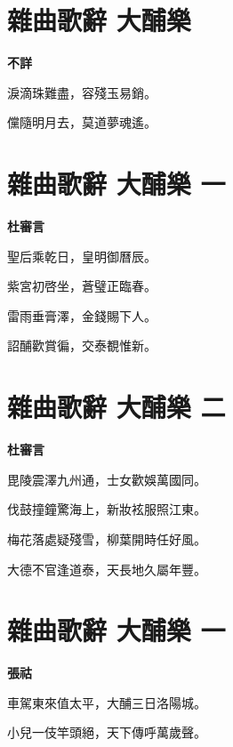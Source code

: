 \documentclass[12pt,a4paper]{ctexbook}
\begin{document}
\section{雜曲歌辭 大酺樂}
\textbf{不詳}\par\vspace{0.5em}
淚滴珠難盡，容殘玉易銷。\par
儻隨明月去，莫道夢魂遙。\par

\section{雜曲歌辭 大酺樂 一}
\textbf{杜審言}\par\vspace{0.5em}
聖后乘乾日，皇明御曆辰。\par
紫宮初啓坐，蒼璧正臨春。\par
雷雨垂膏澤，金錢賜下人。\par
詔酺歡賞徧，交泰覩惟新。\par

\section{雜曲歌辭 大酺樂 二}
\textbf{杜審言}\par\vspace{0.5em}
毘陵震澤九州通，士女歡娛萬國同。\par
伐鼓撞鐘驚海上，新妝袨服照江東。\par
梅花落處疑殘雪，柳葉開時任好風。\par
大德不官逢道泰，天長地久屬年豐。\par

\section{雜曲歌辭 大酺樂 一}
\textbf{張祜}\par\vspace{0.5em}
車駕東來值太平，大酺三日洛陽城。\par
小兒一伎竿頭絕，天下傳呼萬歲聲。\par
\end{document}
